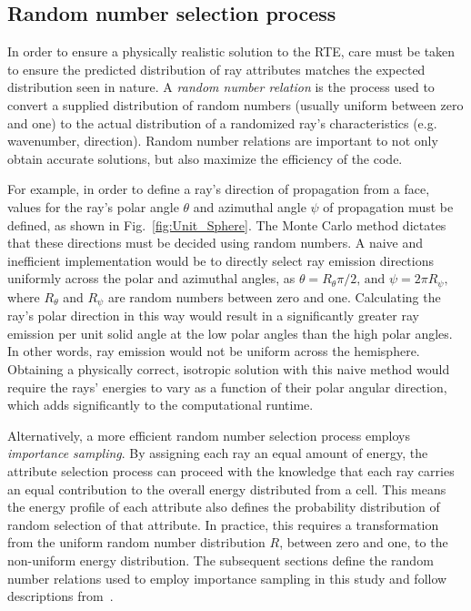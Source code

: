 \subsection{Random number selection process}  \label{section:randomnumberrelations}
In order to ensure a physically realistic solution to the RTE, care must be taken to ensure the predicted distribution of ray attributes matches the expected distribution seen in nature. A \textit{random number relation} is the process used to convert a supplied distribution of random numbers (usually uniform between zero and one) to the actual distribution of a randomized ray's characteristics (e.g. wavenumber, direction).
Random number relations are important to not only obtain accurate solutions, but also maximize the efficiency of the code.

For example, in order to define a ray's direction of propagation from a face, values for the ray's polar angle $\theta{}$ and azimuthal angle $\psi{}$ of propagation must be defined, as shown in Fig.~\ref{fig:Unit_Sphere}. The Monte Carlo method dictates that these directions must be decided using random numbers.
A naive and inefficient implementation would be to directly select ray emission directions uniformly across the polar and azimuthal angles, as $\theta{}=R_\theta{}\pi{}/2 \text{, and }\psi{} = 2\pi{}R_\psi{} ,$
where $R_\theta$ and $R_\psi{}$ are random numbers between zero and one. 
Calculating the ray's polar direction in this way would result in a significantly greater ray emission per unit solid angle at the low polar angles than the high polar angles. In other words, ray emission would not be uniform across the hemisphere. Obtaining a physically correct, isotropic solution with this naive method would require the rays' energies to vary as a function of their polar angular direction, which adds significantly to the computational runtime.

Alternatively, a more efficient random number selection process employs \textit{importance sampling}.
By assigning each ray an equal amount of energy, the attribute selection process can proceed with the knowledge that each ray carries an equal contribution to the overall energy distributed from a cell.
This means the energy profile of each attribute also defines the probability distribution of random selection of that attribute. In practice, this requires a transformation from the uniform random number distribution $R$, between zero and one, to the non-uniform energy distribution.
The subsequent sections define the random number relations used to employ importance sampling in this study and follow descriptions from~\citet{Modest2022ChapterMediac}.


